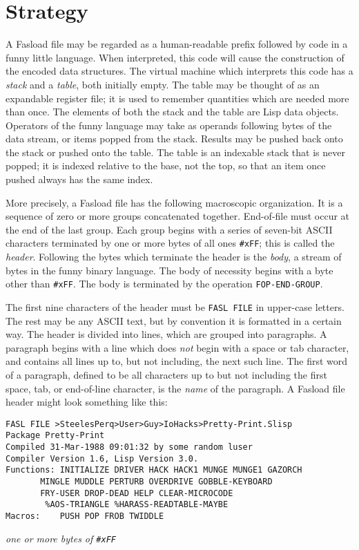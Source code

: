 \section{Strategy}

A Fasload file may be regarded as a human-readable prefix followed by
code in a funny little language.  When interpreted, this code will
cause the construction of the encoded data structures.  The virtual
machine which interprets this code has a {\it stack} and a {\it table},
both initially empty.  The table may be thought of as an expandable
register file; it is used to remember quantities which are needed
more than once.  The elements of both the stack and the table are
Lisp data objects.  Operators of the funny language may take as
operands following bytes of the data stream, or items popped from the
stack.  Results may be pushed back onto the stack or pushed onto the
table.  The table is an indexable stack that is never popped; it is
indexed relative to the base, not the top, so that an item once
pushed always has the same index.

More precisely, a Fasload file has the following macroscopic
organization.  It is a sequence of zero or more groups concatenated
together.  End-of-file must occur at the end of the last group.  Each
group begins with a series of seven-bit ASCII characters terminated
by one or more bytes of all ones \verb|#xFF|; this is called the
{\it header}.  Following the bytes which terminate the header is the
{\it body}, a stream of bytes in the funny binary language.  The body
of necessity begins with a byte other than \verb|#xFF|.  The body is
terminated by the operation {\tt FOP-END-GROUP}.

The first nine characters of the header must be \verb|FASL FILE| in
upper-case letters.  The rest may be any ASCII text, but by
convention it is formatted in a certain way.  The header is divided
into lines, which are grouped into paragraphs.  A paragraph begins
with a line which does {\it not} begin with a space or tab character,
and contains all lines up to, but not including, the next such line.
The first word of a paragraph, defined to be all characters up to but
not including the first space, tab, or end-of-line character, is the
{\it name} of the paragraph.  A Fasload file header might look something like
this:
\begin{verbatim}
FASL FILE >SteelesPerq>User>Guy>IoHacks>Pretty-Print.Slisp
Package Pretty-Print
Compiled 31-Mar-1988 09:01:32 by some random luser
Compiler Version 1.6, Lisp Version 3.0.
Functions: INITIALIZE DRIVER HACK HACK1 MUNGE MUNGE1 GAZORCH
	   MINGLE MUDDLE PERTURB OVERDRIVE GOBBLE-KEYBOARD
	   FRY-USER DROP-DEAD HELP CLEAR-MICROCODE
	    %AOS-TRIANGLE %HARASS-READTABLE-MAYBE
Macros:    PUSH POP FROB TWIDDLE
\end{verbatim}
{\it one or more bytes of \verb|#xFF|}

